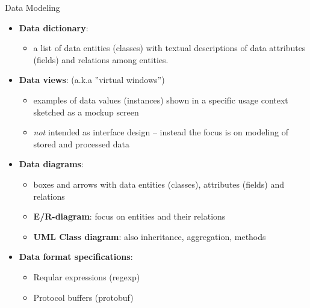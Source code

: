 \begin{Slide}{Data Modeling }
\begin{itemize}
\item \textbf{Data dictionary}:  
\begin{itemize}
\item a list of data entities (classes) with textual descriptions of data attributes (fields) and relations among entities.
\end{itemize}
\item \textbf{Data views}: (a.k.a ''virtual windows'')
\begin{itemize}
\item examples of data values (instances) shown in a specific usage context sketched as a mockup screen
\item \textit{not} intended as interface design -- instead the focus is on modeling of stored and processed data 
\end{itemize}
\item \textbf{Data diagrams}: 
\begin{itemize}
\item boxes and arrows with data entities (classes), attributes (fields) and relations
\item \textbf{E/R-diagram}: focus on entities and their relations 
\item \textbf{UML Class diagram}: also inheritance, aggregation, methods
\end{itemize}
\item \textbf{Data format specifications}:
\begin{itemize}
\item Reqular expressions (regexp)
\item Protocol buffers (protobuf)

\end{itemize}
\end{itemize}
\end{Slide}